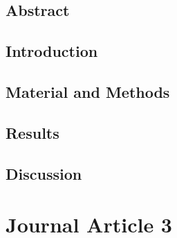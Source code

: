 \documentclass[12pt]{article}
\begin{document}
\subsection*{Abstract}
\subsection*{Introduction}
\subsection*{Material and Methods}						
\subsection*{Results}
\subsection*{Discussion}
\section{Journal Article 3}\label{JA_3}



\end{document}
